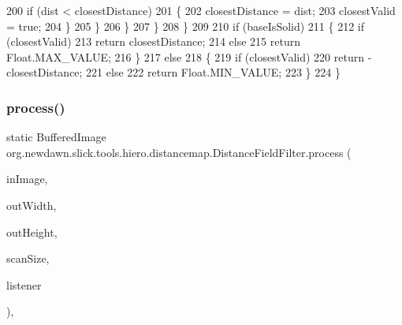 \begin{DoxyCode}
200                         \textcolor{keywordflow}{if} (dist < closestDistance)
201                         \{
202                             closestDistance = dist;
203                             closestValid = \textcolor{keyword}{true};
204                         \}
205                     \}
206                 \}
207             \}
208         \}
209         
210         \textcolor{keywordflow}{if} (baseIsSolid)
211         \{
212             \textcolor{keywordflow}{if} (closestValid)
213                 \textcolor{keywordflow}{return} closestDistance;
214             \textcolor{keywordflow}{else}
215                 \textcolor{keywordflow}{return} Float.MAX\_VALUE;
216         \}
217         \textcolor{keywordflow}{else}
218         \{
219             \textcolor{keywordflow}{if} (closestValid)
220                 \textcolor{keywordflow}{return} -closestDistance;
221             \textcolor{keywordflow}{else}
222                 \textcolor{keywordflow}{return} Float.MIN\_VALUE;
223         \}
224     \}
\end{DoxyCode}
\mbox{\label{classorg_1_1newdawn_1_1slick_1_1tools_1_1hiero_1_1distancemap_1_1_distance_field_filter_aef9a297ea02c10dadb6325423186f832}} 
\subsubsection{\texorpdfstring{process()}{process()}}
{\footnotesize\ttfamily static Buffered\+Image org.\+newdawn.\+slick.\+tools.\+hiero.\+distancemap.\+Distance\+Field\+Filter.\+process (\begin{DoxyParamCaption}\item[{Buffered\+Image}]{in\+Image,  }\item[{int}]{out\+Width,  }\item[{int}]{out\+Height,  }\item[{int}]{scan\+Size,  }\item[{\mbox{\hyperlink{interfaceorg_1_1newdawn_1_1slick_1_1tools_1_1hiero_1_1_progress_listener}{Progress\+Listener}}}]{listener }\end{DoxyParamCaption})\hspace{0.3cm}{\ttfamily [inline]}, {\ttfamily [static]}}

